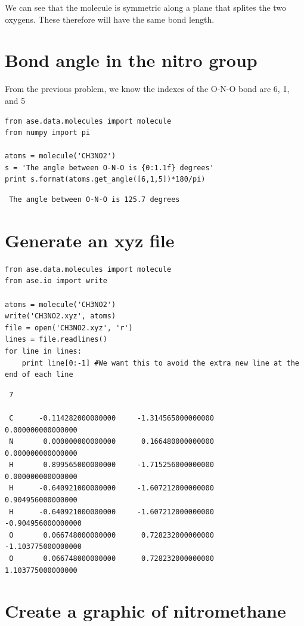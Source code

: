 \documentclass[11pt]{article}
\begin{document}
We can see that the molecule is symmetric along a plane that splites the
two oxygens. These therefore will have the same bond length.
\section{Bond angle in the nitro group}
\label{sec-5}

From the previous problem, we know the indexes of the O-N-O bond are 6, 1, and 5


\begin{verbatim}
from ase.data.molecules import molecule
from numpy import pi

atoms = molecule('CH3NO2')
s = 'The angle between O-N-O is {0:1.1f} degrees'
print s.format(atoms.get_angle([6,1,5])*180/pi)
\end{verbatim}

\begin{verbatim}
 The angle between O-N-O is 125.7 degrees
\end{verbatim}
\section{Generate an xyz file}
\label{sec-6}


\begin{verbatim}
from ase.data.molecules import molecule
from ase.io import write

atoms = molecule('CH3NO2')
write('CH3NO2.xyz', atoms)
file = open('CH3NO2.xyz', 'r')
lines = file.readlines()
for line in lines:
    print line[0:-1] #We want this to avoid the extra new line at the end of each line
\end{verbatim}

\begin{verbatim}
 7
 
 C      -0.114282000000000     -1.314565000000000      0.000000000000000
 N       0.000000000000000      0.166480000000000      0.000000000000000
 H       0.899565000000000     -1.715256000000000      0.000000000000000
 H      -0.640921000000000     -1.607212000000000      0.904956000000000
 H      -0.640921000000000     -1.607212000000000     -0.904956000000000
 O       0.066748000000000      0.728232000000000     -1.103775000000000
 O       0.066748000000000      0.728232000000000      1.103775000000000
\end{verbatim}
\section{Create a graphic of nitromethane}
\label{sec-7}
\end{document}

